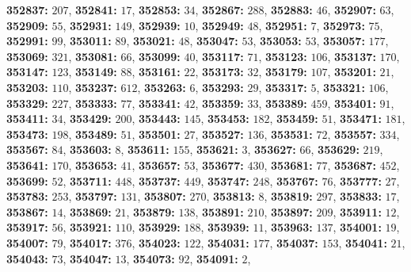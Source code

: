 \textsf{\bfseries 352837:} $207$, \textsf{\bfseries 352841:} $17$, \textsf{\bfseries 352853:} $34$, \textsf{\bfseries 352867:} $288$, \textsf{\bfseries 352883:} $46$, \textsf{\bfseries 352907:} $63$, \textsf{\bfseries 352909:} $55$, \textsf{\bfseries 352931:} $149$, \textsf{\bfseries 352939:} $10$, \textsf{\bfseries 352949:} $48$, \textsf{\bfseries 352951:} $7$, \textsf{\bfseries 352973:} $75$, \textsf{\bfseries 352991:} $99$, \textsf{\bfseries 353011:} $89$, \textsf{\bfseries 353021:} $48$, \textsf{\bfseries 353047:} $53$, \textsf{\bfseries 353053:} $53$, \textsf{\bfseries 353057:} $177$, \textsf{\bfseries 353069:} $321$, \textsf{\bfseries 353081:} $66$, \textsf{\bfseries 353099:} $40$, \textsf{\bfseries 353117:} $71$, \textsf{\bfseries 353123:} $106$, \textsf{\bfseries 353137:} $170$, \textsf{\bfseries 353147:} $123$, \textsf{\bfseries 353149:} $88$, \textsf{\bfseries 353161:} $22$, \textsf{\bfseries 353173:} $32$, \textsf{\bfseries 353179:} $107$, \textsf{\bfseries 353201:} $21$, \textsf{\bfseries 353203:} $110$, \textsf{\bfseries 353237:} $612$, \textsf{\bfseries 353263:} $6$, \textsf{\bfseries 353293:} $29$, \textsf{\bfseries 353317:} $5$, \textsf{\bfseries 353321:} $106$, \textsf{\bfseries 353329:} $227$, \textsf{\bfseries 353333:} $77$, \textsf{\bfseries 353341:} $42$, \textsf{\bfseries 353359:} $33$, \textsf{\bfseries 353389:} $459$, \textsf{\bfseries 353401:} $91$, \textsf{\bfseries 353411:} $34$, \textsf{\bfseries 353429:} $200$, \textsf{\bfseries 353443:} $145$, \textsf{\bfseries 353453:} $182$, \textsf{\bfseries 353459:} $51$, \textsf{\bfseries 353471:} $181$, \textsf{\bfseries 353473:} $198$, \textsf{\bfseries 353489:} $51$, \textsf{\bfseries 353501:} $27$, \textsf{\bfseries 353527:} $136$, \textsf{\bfseries 353531:} $72$, \textsf{\bfseries 353557:} $334$, \textsf{\bfseries 353567:} $84$, \textsf{\bfseries 353603:} $8$, \textsf{\bfseries 353611:} $155$, \textsf{\bfseries 353621:} $3$, \textsf{\bfseries 353627:} $66$, \textsf{\bfseries 353629:} $219$, \textsf{\bfseries 353641:} $170$, \textsf{\bfseries 353653:} $41$, \textsf{\bfseries 353657:} $53$, \textsf{\bfseries 353677:} $430$, \textsf{\bfseries 353681:} $77$, \textsf{\bfseries 353687:} $452$, \textsf{\bfseries 353699:} $52$, \textsf{\bfseries 353711:} $448$, \textsf{\bfseries 353737:} $449$, \textsf{\bfseries 353747:} $248$, \textsf{\bfseries 353767:} $76$, \textsf{\bfseries 353777:} $27$, \textsf{\bfseries 353783:} $253$, \textsf{\bfseries 353797:} $131$, \textsf{\bfseries 353807:} $270$, \textsf{\bfseries 353813:} $8$, \textsf{\bfseries 353819:} $297$, \textsf{\bfseries 353833:} $17$, \textsf{\bfseries 353867:} $14$, \textsf{\bfseries 353869:} $21$, \textsf{\bfseries 353879:} $138$, \textsf{\bfseries 353891:} $210$, \textsf{\bfseries 353897:} $209$, \textsf{\bfseries 353911:} $12$, \textsf{\bfseries 353917:} $56$, \textsf{\bfseries 353921:} $110$, \textsf{\bfseries 353929:} $188$, \textsf{\bfseries 353939:} $11$, \textsf{\bfseries 353963:} $137$, \textsf{\bfseries 354001:} $19$, \textsf{\bfseries 354007:} $79$, \textsf{\bfseries 354017:} $376$, \textsf{\bfseries 354023:} $122$, \textsf{\bfseries 354031:} $177$, \textsf{\bfseries 354037:} $153$, \textsf{\bfseries 354041:} $21$, \textsf{\bfseries 354043:} $73$, \textsf{\bfseries 354047:} $13$, \textsf{\bfseries 354073:} $92$, \textsf{\bfseries 354091:} $2$, 
